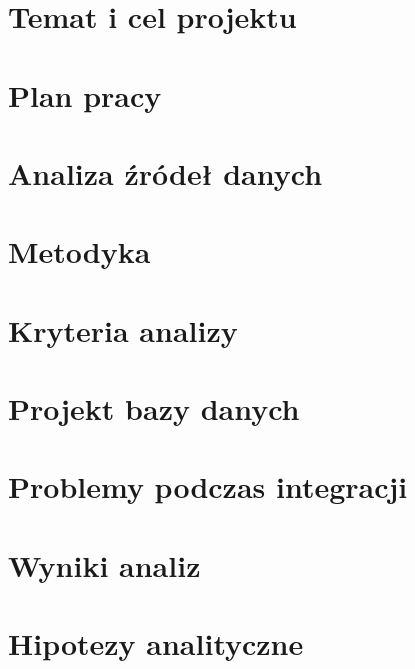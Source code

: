\documentclass[12pt]{aghdpl}
\author{Łukasz Opioła, Beata Skiba}
\date{2015}
\begin{document}
\titlepages

\tableofcontents

\chapter{Temat i cel projektu}
\label{chap:cel}


\chapter{Plan pracy}
\label{chap:plan}


\chapter{Analiza źródeł danych}
\label{chap:analiza-zrodel}


\chapter{Metodyka}
\label{chap:metodyka}


\chapter{Kryteria analizy}
\label{chap:kryteria}


\chapter{Projekt bazy danych}
\label{chap:projekt-bazy}


\chapter{Problemy podczas integracji}
\label{chap:problemy}


\chapter{Wyniki analiz}
\label{chap:wyniki-analiz}


\chapter{Hipotezy analityczne}
\label{chap:hipotezy}

\end{document}
